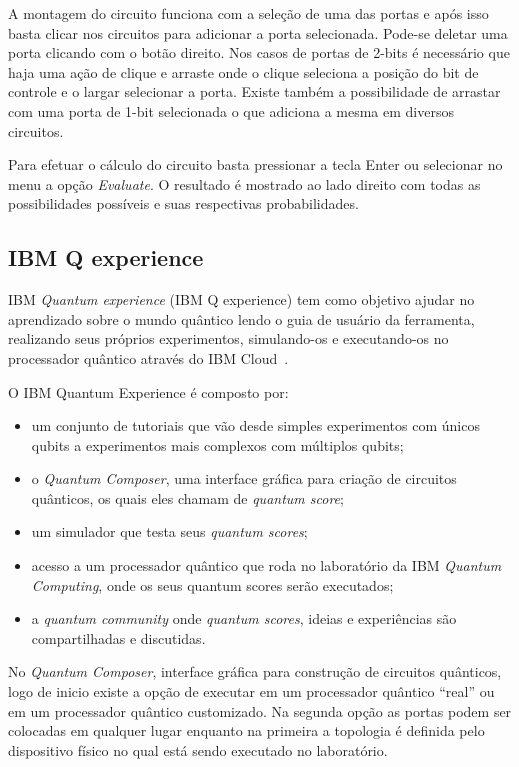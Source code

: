 \documentclass[a4paper, 12pt, oneside]{book}
\begin{document}
A montagem do circuito funciona com a seleção de uma das portas e após isso basta clicar nos circuitos para adicionar a porta selecionada. Pode-se deletar uma porta clicando com o botão direito. Nos casos de portas de 2-bits é necessário que haja uma ação de clique e arraste onde o clique seleciona a posição do bit de controle e o largar selecionar a porta. Existe também a possibilidade de arrastar com uma porta de 1-bit selecionada o que adiciona a mesma em diversos circuitos.

Para efetuar o cálculo do circuito basta pressionar a tecla Enter ou selecionar no menu a opção \textit{Evaluate}. O resultado é mostrado ao lado direito com todas as possibilidades possíveis e suas respectivas probabilidades.

\subsection{IBM Q experience}

IBM \textit{Quantum experience} (IBM Q experience) tem como objetivo ajudar no aprendizado sobre o mundo quântico lendo o guia de usuário da ferramenta, realizando seus próprios experimentos, simulando-os e executando-os no processador quântico através do IBM Cloud~\cite{ibmq}.

O IBM Quantum Experience é composto por:
\begin{itemize}
\item um conjunto de tutoriais que vão desde simples experimentos com únicos qubits a experimentos mais complexos com múltiplos qubits;
\item o \textit{Quantum Composer}, uma interface gráfica para criação de circuitos quânticos, os quais eles chamam de \textit{quantum score};
\item um simulador que testa seus \textit{quantum scores};
\item acesso a um processador quântico que roda no laboratório da IBM \textit{Quantum Computing}, onde os seus quantum scores serão executados;
\item a \textit{quantum community} onde \textit{quantum scores}, ideias e experiências são compartilhadas e discutidas.
\end{itemize}

No \textit{Quantum Composer}, interface gráfica para construção de circuitos quânticos, logo de inicio existe a opção de executar em um processador quântico ``real'' ou em um processador quântico customizado. Na segunda opção as portas podem ser colocadas em qualquer lugar enquanto na primeira a topologia é definida pelo dispositivo físico no qual está sendo executado no laboratório.
\end{document}
